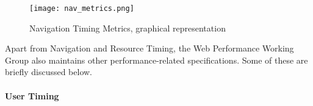 







\begin{figure}[h!]
\begin{center}
\texttt{[image: nav\_metrics.png]}
\caption{Navigation Timing Metrics, graphical representation}
\label{figure:navigation_timing_metrics}
\end{center}
\end{figure}


Apart from Navigation and Resource Timing, the Web Performance Working Group also maintains other performance-related specifications.
Some of these are briefly discussed below.


\paragraph{User Timing} %

